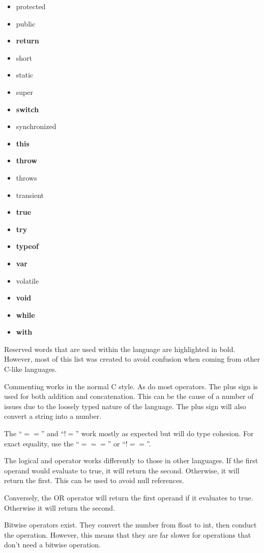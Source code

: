 \documentclass[a4paper,11pt]{report}
\begin{document}
\begin{multicols}{3}
\begin{itemize}
					\item protected
					\item public
					\item \textbf{return} 
					\item short
					\item static 
					\item super
					\item \textbf{switch}
					\item synchronized
					\item \textbf{this}
					\item \textbf{throw}
					\item throws
					\item transient
					\item \textbf{true}
					\item \textbf{try}
					\item \textbf{typeof}
					\item \textbf{var} 
					\item volatile
					\item \textbf{void}
					\item \textbf{while}
					\item \textbf{with}
				\end{itemize}
			\end{multicols}
			Reserved words that are used within the language are highlighted in bold. 
			However, most of this list was created to avoid confusion when coming from other C-like languages. 

			Commenting works in the normal C style. 
			As do most operators. 
			The plus sign is used for both addition and concatenation. 
			This can be the cause of a number of issues due to the loosely typed nature of the language. 
			The plus sign will also convert a string into a number. 

			The ``$==$'' and ``$!=$'' work mostly as expected but will do type cohesion. 
			For exact equality, use the ``$===$'' or ``$!==$''. 

			The logical and operator works differently to those in other languages. 
			If the first operand would evaluate to true, it will return the second.
			Otherwise, it will return the first. 
			This can be used to avoid null references. 

			Conversely, the OR operator will return the first operand if it evaluates to true. 
			Otherwise it will return the second. 

			Bitwise operators exist. 
			They convert the number from float to int, then conduct the operation. 
			However, this means that they are far slower for operations that don't need a bitwise operation. 
\end{document}
